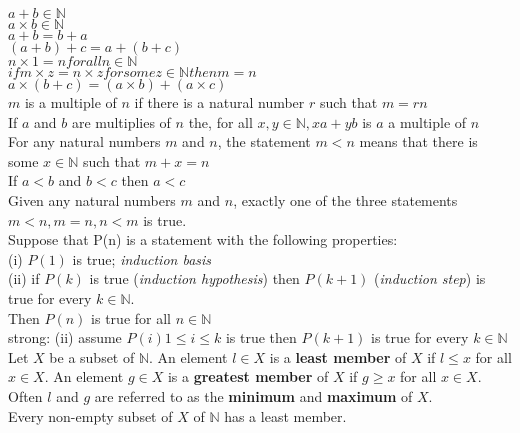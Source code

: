 \documentclass[10pt,landscape]{article}
\begin{document}
\raggedright
\footnotesize
\begin{multicols}{3}


\setlength{\premulticols}{1pt}
\setlength{\postmulticols}{1pt}
\setlength{\multicolsep}{1pt}
\setlength{\columnsep}{2pt}

$a+b \in \mathbb{N}$\\
$a \times b \in \mathbb{N}$\\
$a + b = b + a$\\
$(a + b) + c = a + (b + c)$\\
$n \times 1 = n for all n \in \mathbb{N}$\\
$if m \times z = n \times z for some z \in \mathbb{N} then m = n$\\
$a \times (b + c) = (a \times b) + (a \times c)$\\
$m$ is a multiple of $n$ if there is a natural number $r$ such that $m = rn$\\
If $a$ and $b$ are multiplies of $n$ the, for all $x, y \in \mathbb{N}, xa + yb$ is $a$ a multiple of $n$\\
For any natural numbers $m$ and $n$, the statement $m < n$ means that there is some $x \in \mathbb{N}$ such that $m + x = n$\\
If $a < b$ and $b < c$ then $a < c$\\
Given any natural numbers $m$ and $n$, exactly one of the three statements $m<n, m=n, n<m$ is true.\\
Suppose that P(n) is a statement with the following properties:\\
(i) $P(1)$ is true; \textit{induction basis}\\
(ii) if $P(k)$ is true (\textit{induction hypothesis}) then $P(k+1)$ (\textit{induction step}) is true for every $k \in \mathbb{N}$.\\ 
Then $P(n)$ is true for all $n \in \mathbb{N}$\\
strong: (ii) assume $P(i) 1 \leq i \leq k$ is true then $P(k+1)$ is true for every $k \in \mathbb{N}$\\
Let $X$ be a subset of $\mathbb{N}$. An element $l \in X$ is a \textbf{least member} of $X$ if $l \leq x$ for all $x \in X$. An element $g \in X$ is a \textbf{greatest member} of $X$ if $g \geq x$ for all $x \in X$. Often $l$ and $g$ are referred to as the \textbf{minimum} and \textbf{maximum} of $X$.\\
Every non-empty subset of $X$ of $\mathbb{N}$ has a least member.\\

\end{multicols}
\end{document}
